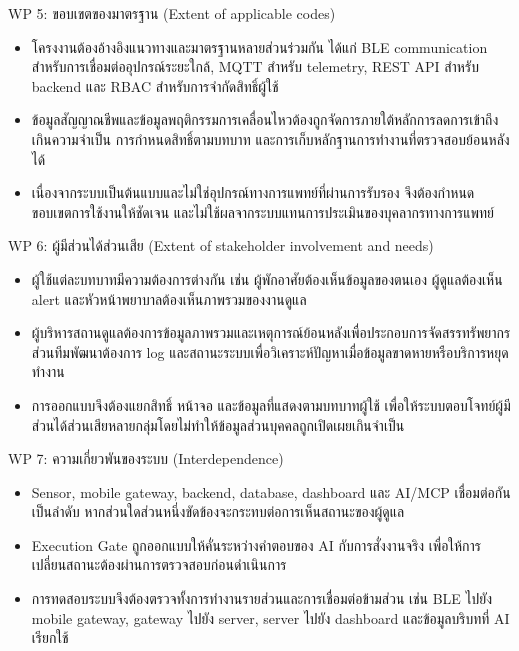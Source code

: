 \noindent\wschecked WP 5: ขอบเขตของมาตรฐาน (Extent of applicable codes)
\begin{itemize}
    \item โครงงานต้องอ้างอิงแนวทางและมาตรฐานหลายส่วนร่วมกัน ได้แก่ BLE communication สำหรับการเชื่อมต่ออุปกรณ์ระยะใกล้, MQTT สำหรับ telemetry, REST API สำหรับ backend และ RBAC สำหรับการจำกัดสิทธิ์ผู้ใช้ 
    \item ข้อมูลสัญญาณชีพและข้อมูลพฤติกรรมการเคลื่อนไหวต้องถูกจัดการภายใต้หลักการลดการเข้าถึงเกินความจำเป็น การกำหนดสิทธิ์ตามบทบาท และการเก็บหลักฐานการทำงานที่ตรวจสอบย้อนหลังได้ 
    \item เนื่องจากระบบเป็นต้นแบบและไม่ใช่อุปกรณ์ทางการแพทย์ที่ผ่านการรับรอง จึงต้องกำหนดขอบเขตการใช้งานให้ชัดเจน และไม่ใช้ผลจากระบบแทนการประเมินของบุคลากรทางการแพทย์ 
\end{itemize}

\noindent\wschecked WP 6: ผู้มีส่วนได้ส่วนเสีย (Extent of stakeholder involvement and needs)
\begin{itemize}
    \item ผู้ใช้แต่ละบทบาทมีความต้องการต่างกัน เช่น ผู้พักอาศัยต้องเห็นข้อมูลของตนเอง ผู้ดูแลต้องเห็น alert และหัวหน้าพยาบาลต้องเห็นภาพรวมของงานดูแล 
    \item ผู้บริหารสถานดูแลต้องการข้อมูลภาพรวมและเหตุการณ์ย้อนหลังเพื่อประกอบการจัดสรรทรัพยากร ส่วนทีมพัฒนาต้องการ log และสถานะระบบเพื่อวิเคราะห์ปัญหาเมื่อข้อมูลขาดหายหรือบริการหยุดทำงาน 
    \item การออกแบบจึงต้องแยกสิทธิ์ หน้าจอ และข้อมูลที่แสดงตามบทบาทผู้ใช้ เพื่อให้ระบบตอบโจทย์ผู้มีส่วนได้ส่วนเสียหลายกลุ่มโดยไม่ทำให้ข้อมูลส่วนบุคคลถูกเปิดเผยเกินจำเป็น 
\end{itemize}

\noindent\wschecked WP 7: ความเกี่ยวพันของระบบ (Interdependence)
\begin{itemize}
    \item Sensor, mobile gateway, backend, database, dashboard และ AI/MCP เชื่อมต่อกันเป็นลำดับ หากส่วนใดส่วนหนึ่งขัดข้องจะกระทบต่อการเห็นสถานะของผู้ดูแล 
    \item Execution Gate ถูกออกแบบให้คั่นระหว่างคำตอบของ AI กับการสั่งงานจริง เพื่อให้การเปลี่ยนสถานะต้องผ่านการตรวจสอบก่อนดำเนินการ 
    \item การทดสอบระบบจึงต้องตรวจทั้งการทำงานรายส่วนและการเชื่อมต่อข้ามส่วน เช่น BLE ไปยัง mobile gateway, gateway ไปยัง server, server ไปยัง dashboard และข้อมูลบริบทที่ AI เรียกใช้ 
\end{itemize}

